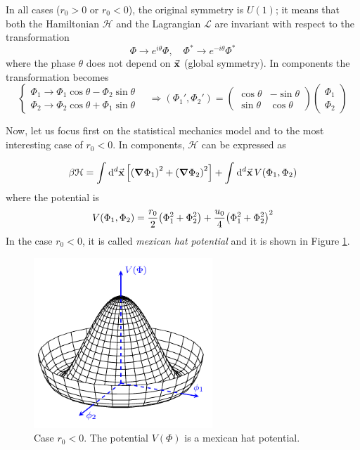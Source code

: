 \documentclass[../main/main.tex]{subfiles}
\begin{document}
In all cases (\( r_0 > 0 \) or \( r_0 < 0 \)), the original symmetry is \( U(1) \); it means that both the Hamiltonian \( \mathcal{H} \) and the Lagrangian \( \mathcal{L} \) are invariant with respect to the transformation
\begin{equation}
  \Phi \rightarrow e^{i \theta } \Phi , \quad \Phi ^* \rightarrow e^{-i \theta } \Phi ^*
\end{equation}
where the phase \( \theta  \) does not depend on \( \va{x} \) (global symmetry).
In components the transformation becomes
\begin{equation*}
  \begin{cases}
   \Phi _1 \rightarrow  \Phi _1 \cos \theta - \Phi _2 \sin \theta \\
  \Phi _2 \rightarrow  \Phi _2 \cos \theta + \Phi _1 \sin \theta
  \end{cases}
  \quad \Rightarrow
  (\Phi _1', \Phi _2') = \begin{pmatrix}
  \cos \theta    & - \sin \theta   \\
    \sin \theta  & \cos \theta
  \end{pmatrix}
  \begin{pmatrix}
  \Phi _1 \\
  \Phi _2
  \end{pmatrix}
\end{equation*}

Now, let us focus first on the statistical mechanics model and to the most interesting case of \( r_0 <0 \).
In components, \( \mathcal{H} \) can be expressed as

\begin{equation}
  \beta \mathcal{H} = \int_{}^{} \dd[d]{\va{x}} \qty[\qty(\grad \Phi _1)^2 + \qty(\grad \Phi _2)^2  ] + \int_{}^{} \dd[d]{\va{x}} V (\Phi _1, \Phi _2)
\end{equation}
where the potential is
\begin{equation}
  V (\Phi _1, \Phi _2) = \frac{r_0}{2} \qty(\Phi _1^2 + \Phi _2^2) + \frac{u_0}{4} \qty( \Phi _1^2 + \Phi _2^2)^2
  \label{eq:n_6}
\end{equation}
In the case \( r_0 < 0 \), it is called \emph{mexican hat potential} and it is shown in Figure \ref{fig:n_1}.

\begin{figure}[h!]
\centering
\includegraphics[width=0.6\textwidth]{../lessons/n_image/3.pdf}
\caption{\label{fig:n_1} Case \( r_0 < 0 \). The potential \( V(\Phi ) \) is a mexican hat potential.}
\end{figure}
\end{document}
